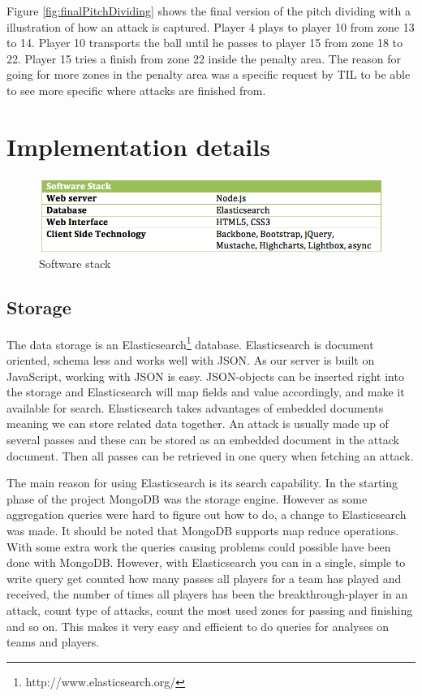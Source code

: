 Figure \ref{fig:finalPitchDividing} shows the final version of the pitch dividing with a illustration of how an attack is captured. Player 4 plays to player 10 from zone 13 to 14. Player 10 transports the ball until he passes to player 15 from zone 18 to 22. Player 15 tries a finish from zone 22 inside the penalty area. The reason for going for more zones in the penalty area was a specific request by \ac{TIL} to be able to see more specific where attacks are finished from.

\section{Implementation details}

\begin{figure}[ht!]
\centering
\includegraphics[width=1\textwidth]{images/implementation/software_stack.png}
\caption{Software stack}
\end{figure}

\subsection{Storage}

The data storage is an Elasticsearch\footnote{http://www.elasticsearch.org/} database. Elasticsearch is document oriented, schema less and works well with \ac{JSON}\footnotemark. As our server is built on JavaScript, working with \ac{JSON} is easy. \ac{JSON}-objects can be inserted right into the storage and Elasticsearch will map fields and value accordingly, and make it available for search.
Elasticsearch takes advantages of embedded documents meaning we can store related data together. An attack is usually made up of several passes and these can be stored as an embedded document in the attack document. Then all passes can be retrieved in one query when fetching an attack.

The main reason for using Elasticsearch is its search capability. In the starting phase of the project MongoDB \footnotemark was the storage engine. However as some aggregation queries were hard to figure out how to do, a change to Elasticsearch was made. It should be noted that MongoDB supports map reduce operations. With some extra work the queries causing problems could possible have been done with MongoDB. However, with Elasticsearch you can in a single, simple to write query get counted how many passes all players for a team has played and received, the number of times all players has been the breakthrough-player in an attack, count type of attacks, count the most used zones for passing and finishing and so on. This makes it very easy and efficient to do queries for analyses on teams and players.

